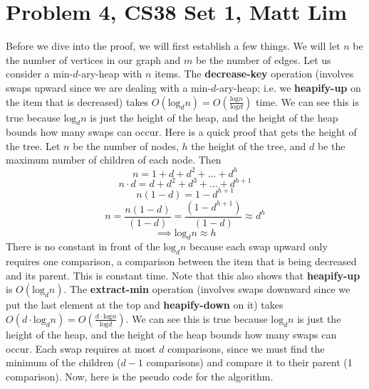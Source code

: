 \documentclass{article}
\begin{document}
\section*{Problem 4, CS38 Set 1, Matt Lim}
Before we dive into the proof, we will first establish a few things. We will
let $n$ be the number of vertices in our graph and $m$ be the number of edges. Let us
consider a min-$d$-ary-heap with $n$ items. The \textbf{decrease-key} operation
(involves swaps upward since we are dealing with a min-$d$-ary-heap; i.e. we
\textbf{heapify-up} on the item that is decreased)
takes $O(\text{log}_dn) = O(\frac{\text{log}n}{\text{log}d})$ time. We can see
this is true because $\text{log}_dn$ is just the
height of the heap, and the height of the heap bounds how many swaps can occur.
Here is a quick proof that gets the height of the tree. Let $n$ be the number of
nodes, $h$ the height of the tree,  and $d$ be the maximum number of children of each node. Then
\[ n = 1 + d + d^2 + \dots + d^h \]
\[ n \cdot d = d + d^2 + d^3 + \dots + d^{h+1} \]
\[ n(1 - d) = 1 - d^{h+1} \]
\[ n = \frac{n(1-d)}{(1-d)} = \frac{(1 - d^{h+1})}{(1-d)} \approx d^{h} \]
\[ \implies \text{log}_dn \approx h\]
There is no constant in front of the $\text{log}_dn$ because each swap upward only
requires one comparison, a comparison between the item that is being decreased
and its parent. This is constant time. Note that this also shows that
\textbf{heapify-up} is $O(\text{log}_dn)$.
The \textbf{extract-min} operation
(involves swaps downward since we put the last element at the top and
\textbf{heapify-down} on it) takes $O(d \cdot \text{log}_dn) = O(\frac{d \cdot
\text{log}n}{\text{log}d})$.  We can see this is true because $\text{log}_dn$ is just the
height of the heap, and the height of the heap bounds how many swaps can occur.
Each swap requires at most $d$ comparisons, since we must find the minimum of
the children ($d-1$ comparisons) and compare it to their parent (1 comparison).
Now, here is the pseudo code for the algorithm.
\end{document}
